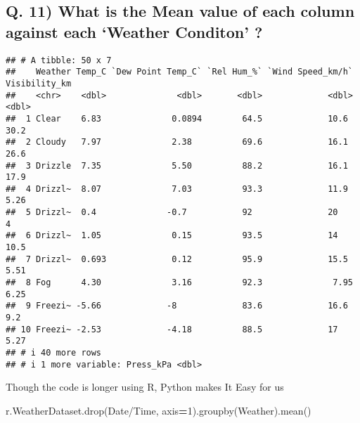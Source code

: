 \documentclass[
]{article}
\newenvironment{Shaded}{\begin{snugshade}}{\end{snugshade}}
\newcommand{\DecValTok}[1]{\textcolor[rgb]{0.00,0.00,0.81}{#1}}
\newcommand{\NormalTok}[1]{#1}
\newcommand{\OperatorTok}[1]{\textcolor[rgb]{0.81,0.36,0.00}{\textbf{#1}}}
\newcommand{\StringTok}[1]{\textcolor[rgb]{0.31,0.60,0.02}{#1}}
\begin{document}
\hypertarget{q.-11-what-is-the-mean-value-of-each-column-against-each-weather-conditon}{%
\subsection{Q. 11) What is the Mean value of each column against each
`Weather Conditon'
?}\label{q.-11-what-is-the-mean-value-of-each-column-against-each-weather-conditon}}

\begin{verbatim}
## # A tibble: 50 x 7
##    Weather Temp_C `Dew Point Temp_C` `Rel Hum_%` `Wind Speed_km/h` Visibility_km
##    <chr>    <dbl>              <dbl>       <dbl>             <dbl>         <dbl>
##  1 Clear    6.83              0.0894        64.5             10.6          30.2 
##  2 Cloudy   7.97              2.38          69.6             16.1          26.6 
##  3 Drizzle  7.35              5.50          88.2             16.1          17.9 
##  4 Drizzl~  8.07              7.03          93.3             11.9           5.26
##  5 Drizzl~  0.4              -0.7           92               20             4   
##  6 Drizzl~  1.05              0.15          93.5             14            10.5 
##  7 Drizzl~  0.693             0.12          95.9             15.5           5.51
##  8 Fog      4.30              3.16          92.3              7.95          6.25
##  9 Freezi~ -5.66             -8             83.6             16.6           9.2 
## 10 Freezi~ -2.53             -4.18          88.5             17             5.27
## # i 40 more rows
## # i 1 more variable: Press_kPa <dbl>
\end{verbatim}

Though the code is longer using R, Python makes It Easy for us

\begin{Shaded}
\begin{Highlighting}[]
\NormalTok{r.WeatherDataset.drop(}\StringTok{\textquotesingle{}Date/Time\textquotesingle{}}\NormalTok{, axis}\OperatorTok{=}\DecValTok{1}\NormalTok{).groupby(}\StringTok{\textquotesingle{}Weather\textquotesingle{}}\NormalTok{).mean()}
\end{Highlighting}
\end{Shaded}
\end{document}
